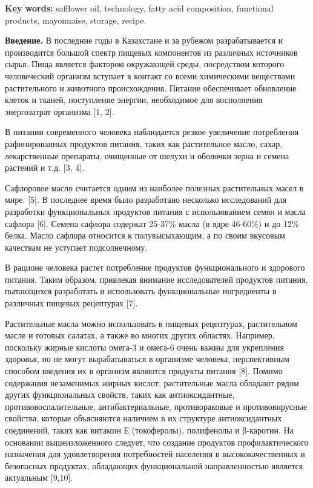 {\bfseries Key words:} safflower oil, technology, fatty acid composition,
functional products, mayonnaise, storage, recipe.

\begin{multicols}{2}
{\bfseries Введение.} В последние годы в Казахстане и за рубежом
разрабатывается и производится большой спектр пищевых компонентов из
различных источников сырья. Пища является фактором окружающей среды,
посредством которого человеческий организм вступает в контакт со всеми
химическими веществами растительного и животного происхождения. Питание
обеспечивает обновление клеток и тканей, поступление энергии,
необходимое для восполнения энергозатрат организма {[}1, 2{]}.

В питании современного человека наблюдается резкое увеличение
потребления рафинированных продуктов питания, таких как растительное
масло, сахар, лекарственные препараты, очищенные от шелухи и оболочки
зерна и семена растений и т.д. {[}3, 4{]}.

Сафлоровое масло считается одним из наиболее полезных растительных масел
в мире. {[}5{]}. В последнее время было разработано несколько
исследований для разработки функциональных продуктов питания с
использованием семян и масла сафлора {[}6{]}. Семена сафлора содержат
25-37\% масла (в ядре 46-60\%) и до 12\% белка. Масло сафлора относится
к полувысыхающим, а по своим вкусовым качествам не уступает
подсолнечному.

В рационе человека растет потребление продуктов функционального и
здорового питания. Таким образом, привлекая внимание исследователей
продуктов питания, пытающихся разработать и использовать функциональные
ингредиенты в различных пищевых рецептурах {[}7{]}.

Растительные масла можно использовать в пищевых рецептурах, растительном
масле и готовых салатах, а также во многих других областях. Например,
поскольку жирные кислоты омега-3 и омега-6 очень важны для укрепления
здоровья, но не могут вырабатываться в организме человека, перспективным
способом введения их в организм являются продукты питания {[}8{]}.
Помимо содержания незаменимых жирных кислот, растительные масла обладают
рядом других функциональных свойств, таких как антиоксидантные,
противовоспалительные, антибактериальные, противораковые и
противовирусные свойства, которые объясняются наличием в их структуре
антиоксидантных соединений, таких как витамин Е (токоферолы), полифенолы
и β-каротин. На основании вышеизложенного следует, что создание
продуктов профилактического назначения для удовлетворения потребностей
населения в высококачественных и безопасных продуктах, обладающих
функциональной направленностью является актуальным {[}9,10{]}.


\end{multicols}
